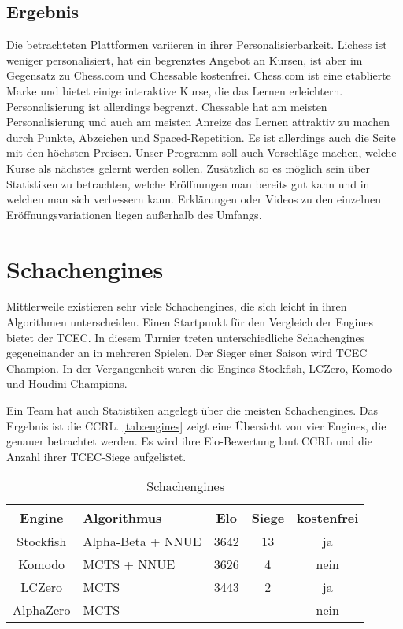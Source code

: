 \subsection{Ergebnis}
Die betrachteten Plattformen variieren in ihrer Personalisierbarkeit. Lichess ist weniger personalisiert, hat ein begrenztes Angebot an Kursen, ist aber im Gegensatz zu Chess.com und Chessable kostenfrei. Chess.com ist eine etablierte Marke und bietet einige interaktive Kurse, die das Lernen erleichtern. Personalisierung ist allerdings begrenzt. Chessable hat am meisten Personalisierung und auch am meisten Anreize das Lernen attraktiv zu machen durch Punkte, Abzeichen und Spaced-Repetition. Es ist allerdings auch die Seite mit den höchsten Preisen. Unser Programm soll auch Vorschläge machen, welche Kurse als nächstes gelernt werden sollen. Zusätzlich so es  möglich sein über Statistiken zu betrachten, welche Eröffnungen man bereits gut kann und in welchen man sich verbessern kann. Erklärungen oder Videos zu den einzelnen Eröffnungsvariationen liegen außerhalb des Umfangs.


\section{Schachengines}
Mittlerweile existieren sehr viele Schachengines, die sich leicht in ihren Algorithmen unterscheiden. Einen Startpunkt für den Vergleich der Engines bietet der \ac{TCEC}. In diesem Turnier treten unterschiedliche Schachengines gegeneinander an in mehreren Spielen. Der Sieger einer Saison wird  \ac{TCEC} Champion. In der Vergangenheit waren die Engines Stockfish, LCZero, Komodo und Houdini Champions. \cite{tcec_chessdom_tcec-chess_2025}

Ein Team hat auch Statistiken angelegt über die meisten Schachengines. Das Ergebnis ist die \acf{CCRL}. \cite{ccrl_team_ccrl_2025} \autoref{tab:engines} zeigt eine Übersicht von vier Engines, die genauer betrachtet werden. Es wird ihre Elo-Bewertung laut \ac{CCRL} und die Anzahl ihrer \ac{TCEC}-Siege aufgelistet.

\begin{table}[h]
    \centering
    \begin{tabular}{|c|l|c|c|c|}
        \hline
        Engine & Algorithmus & Elo & Siege & kostenfrei \\
        \hline
        Stockfish & Alpha-Beta + \acs{NNUE} & 3642 & 13 & ja \\
        \hline
        Komodo & \acs{MCTS} + \acs{NNUE} & 3626 & 4 & nein \\
        \hline
        LCZero & \acs{MCTS} & 3443 & 2 & ja \\
        \hline
        AlphaZero & \acs{MCTS} & - & - & nein \\
        \hline
    \end{tabular}
    \caption{Schachengines}
    \label{tab:engines}
\end{table}

